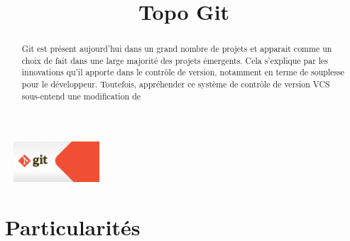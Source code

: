 \documentclass[a4paper]{article}
\title{Topo Git}           		%
\date{}                       %
\begin{document}
\maketitle                    %
\begin{center}
	\includegraphics[width=145px,height=57px]{illustrations/6-30-12_Git.jpg}
\end{center}
\begin{abstract}
Git est présent aujourd'hui dans un grand nombre de projets et apparait comme un choix de fait dans une large majorité des projets émergents. Cela s'explique par les innovations qu'il apporte dans le contrôle de version, notamment en terme de souplesse pour le développeur.
Toutefois, appréhender ce système de contrôle de version \gls{VCS} sous-entend une modification de 

\end{abstract}
\tableofcontents			  %


\section{Particularités}      %




\end{document}
